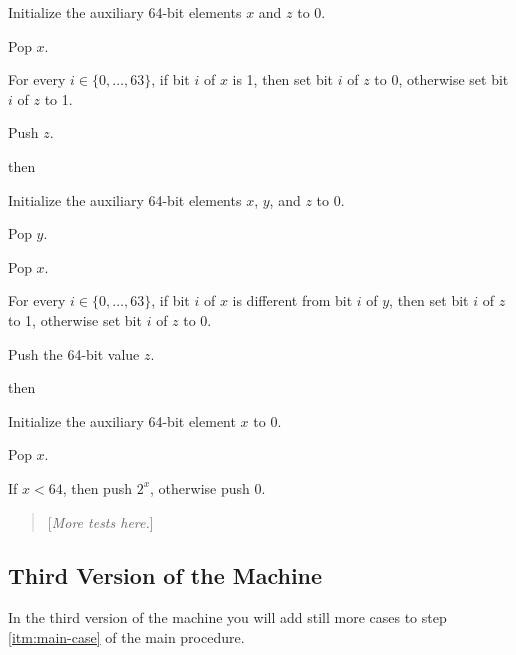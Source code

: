 \documentclass[a4paper,12pt]{article}
\newcommand{\num}[1]{\texttt{#1}\xspace}
\newcommand{\hex}[1]{\num{#1}$_{\textup{\tiny\hskip-1ex 16}}$\xspace}
\newcommand{\range}[2]{\{#1,\ldots,#2\}}
\newcommand{\comment}[1]{\begin{quote}[\textit{#1}]\end{quote}}
\newcommand{\op}[1]{#1}
\newcommand{\XOR}       [1]{\op{\hex{2B}}}
\newcommand{\POW}       [1]{\op{\hex{2C}}}
\begin{document}
\begin{stepnumbers}[start=3]
\begin{description}
\begin{stepnumbers}
    \item Initialize the auxiliary 64-bit elements $x$ and $z$ to 0.
    \item Pop $x$.
    \item For every $i \in \range{0}{63}$, if bit $i$ of $x$ is 1, then set bit $i$ of $z$ to 0, otherwise set bit $i$ of $z$ to 1.
    \item Push $z$.
    \end{stepnumbers}
  \item[\XOR{}] then
    \begin{stepnumbers}
    \item Initialize the auxiliary 64-bit elements $x$, $y$, and $z$ to 0.
    \item Pop $y$.
    \item Pop $x$.
    \item For every $i \in \range{0}{63}$, if bit $i$ of $x$ is different from bit $i$ of $y$, then set bit $i$ of $z$ to 1, otherwise set bit $i$ of $z$ to 0.
    \item Push the 64-bit value $z$.
    \end{stepnumbers}
  \item[\POW{}] then
    \begin{stepnumbers}
    \item Initialize the auxiliary 64-bit element $x$ to 0.
    \item Pop $x$.
    \item If $x < 64$, then push $2^x$, otherwise push 0.
    \end{stepnumbers}
  \end{description}
\end{stepnumbers}

\comment{More tests here.}

\subsection{Third Version of the Machine}

In the third version of the machine you will add still more cases to step \ref{itm:main-case} of the main procedure.
\end{document}

